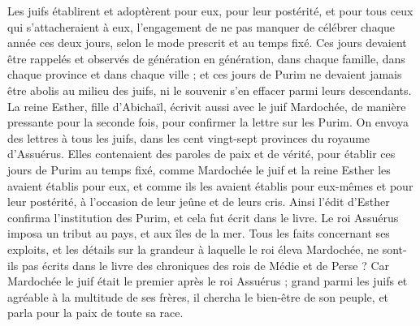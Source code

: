 \begin{multicols}{2}
Les juifs établirent et adoptèrent pour eux, pour leur postérité, et pour tous ceux qui s’attacheraient à eux, l’engagement de ne pas manquer de célébrer chaque année ces deux jours, selon le mode prescrit et au temps fixé.
Ces jours devaient être rappelés et observés de génération en génération, dans chaque famille, dans chaque province et dans chaque ville ; et ces jours de Purim ne devaient jamais être abolis au milieu des juifs, ni le souvenir s’en effacer parmi leurs descendants.
La reine Esther, fille d'Abichaïl, écrivit aussi avec le juif Mardochée, de manière pressante pour la seconde fois, pour confirmer la lettre sur les Purim.
On envoya des lettres à tous les juifs, dans les cent vingt-sept provinces du royaume d'Assuérus. Elles contenaient des paroles de paix et de vérité,
pour établir ces jours de Purim au temps fixé, comme Mardochée le juif et la reine Esther les avaient établis pour eux, et comme ils les avaient établis pour eux-mêmes et pour leur postérité, à l’occasion de leur jeûne et de leurs cris.
Ainsi l'édit d'Esther confirma l’institution des Purim, et cela fut écrit dans le livre.
\VerseOne{}Le roi Assuérus imposa un tribut au pays, et aux îles de la mer.
Tous les faits concernant ses exploits, et les détails sur la grandeur à laquelle le roi éleva Mardochée, ne sont-ils pas écrits dans le livre des chroniques des rois de Médie et de Perse ?
Car Mardochée le juif était le premier après le roi Assuérus ; grand parmi les juifs et agréable à la multitude de ses frères, il chercha le bien-être de son peuple, et parla pour la paix de toute sa race.
\PPE{}
\end{multicols}